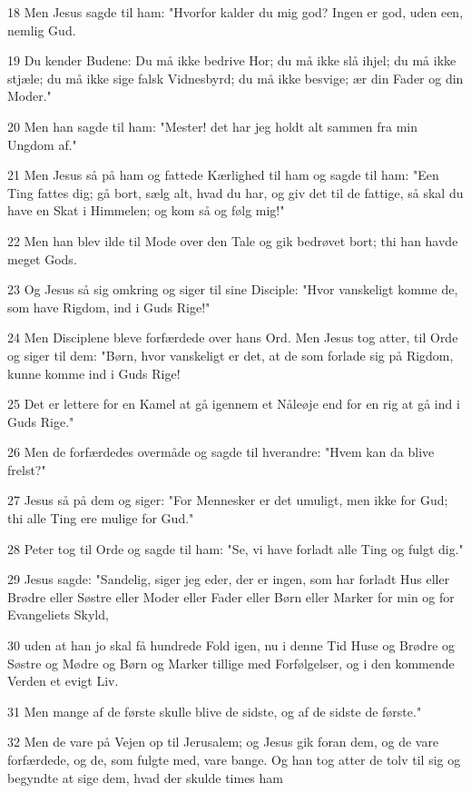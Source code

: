 \par 18 Men Jesus sagde til ham: "Hvorfor kalder du mig god? Ingen er god, uden een, nemlig Gud.
\par 19 Du kender Budene: Du må ikke bedrive Hor; du må ikke slå ihjel; du må ikke stjæle; du må ikke sige falsk Vidnesbyrd; du må ikke besvige; ær din Fader og din Moder."
\par 20 Men han sagde til ham: "Mester! det har jeg holdt alt sammen fra min Ungdom af."
\par 21 Men Jesus så på ham og fattede Kærlighed til ham og sagde til ham: "Een Ting fattes dig; gå bort, sælg alt, hvad du har, og giv det til de fattige, så skal du have en Skat i Himmelen; og kom så og følg mig!"
\par 22 Men han blev ilde til Mode over den Tale og gik bedrøvet bort; thi han havde meget Gods.
\par 23 Og Jesus så sig omkring og siger til sine Disciple: "Hvor vanskeligt komme de, som have Rigdom, ind i Guds Rige!"
\par 24 Men Disciplene bleve forfærdede over hans Ord. Men Jesus tog atter, til Orde og siger til dem: "Børn, hvor vanskeligt er det, at de som forlade sig på Rigdom, kunne komme ind i Guds Rige!
\par 25 Det er lettere for en Kamel at gå igennem et Nåleøje end for en rig at gå ind i Guds Rige."
\par 26 Men de forfærdedes overmåde og sagde til hverandre: "Hvem kan da blive frelst?"
\par 27 Jesus så på dem og siger: "For Mennesker er det umuligt, men ikke for Gud; thi alle Ting ere mulige for Gud."
\par 28 Peter tog til Orde og sagde til ham: "Se, vi have forladt alle Ting og fulgt dig."
\par 29 Jesus sagde: "Sandelig, siger jeg eder, der er ingen, som har forladt Hus eller Brødre eller Søstre eller Moder eller Fader eller Børn eller Marker for min og for Evangeliets Skyld,
\par 30 uden at han jo skal få hundrede Fold igen, nu i denne Tid Huse og Brødre og Søstre og Mødre og Børn og Marker tillige med Forfølgelser, og i den kommende Verden et evigt Liv.
\par 31 Men mange af de første skulle blive de sidste, og af de sidste de første."
\par 32 Men de vare på Vejen op til Jerusalem; og Jesus gik foran dem, og de vare forfærdede, og de, som fulgte med, vare bange. Og han tog atter de tolv til sig og begyndte at sige dem, hvad der skulde times ham
